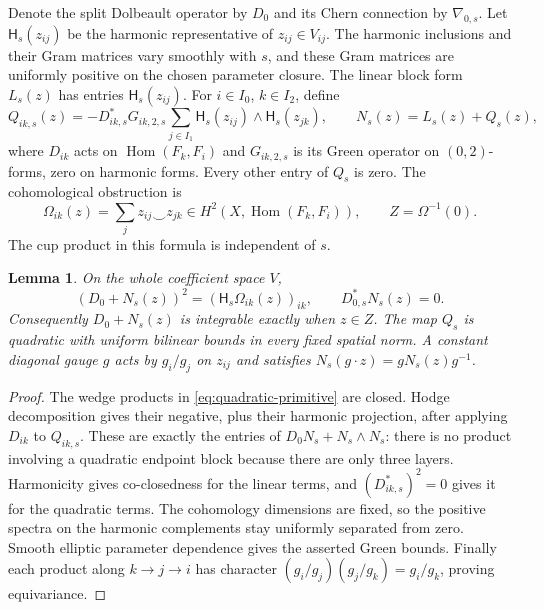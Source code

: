 \documentclass[11pt]{amsart}
\newtheorem{lemma}[theorem]{Lemma}
\theoremstyle{definition}
\theoremstyle{remark}
\newcommand{\Hom}{\operatorname{Hom}}
\newcommand{\HH}{\mathsf H}
\begin{document}
Denote the split Dolbeault operator by $D_0$ and its Chern connection by
$\nabla_{0,s}$. Let $\HH_s(z_{ij})$ be the harmonic representative of
$z_{ij}\in V_{ij}$. The harmonic inclusions and their Gram matrices vary
smoothly with $s$, and these Gram matrices are uniformly positive on the
chosen parameter closure. The linear block form $L_s(z)$ has entries
$\HH_s(z_{ij})$. For $i\in I_0$, $k\in I_2$, define
\begin{equation}\label{eq:quadratic-primitive}
 Q_{ik,s}(z)=-D_{ik,s}^*G_{ik,2,s}
       \sum_{j\in I_1}\HH_s(z_{ij})\wedge\HH_s(z_{jk}),
 \qquad N_s(z)=L_s(z)+Q_s(z),
\end{equation}
where $D_{ik}$ acts on $\Hom(F_k,F_i)$ and $G_{ik,2,s}$ is its
Green operator on $(0,2)$-forms, zero on harmonic forms. Every other
entry of $Q_s$ is zero. The cohomological obstruction is
\begin{equation}\label{eq:obstruction}
 \Omega_{ik}(z)=\sum_j z_{ij}\smile z_{jk}
 \in H^2(X,\Hom(F_k,F_i)),\qquad Z=\Omega^{-1}(0).
\end{equation}
The cup product in this formula is independent of $s$.

\begin{lemma}\label{lem:canonical}
On the whole coefficient space $V$,
\begin{equation}\label{eq:canonical-identities}
 (D_0+N_s(z))^2=(\HH_s\Omega_{ik}(z))_{ik},\qquad
 D_{0,s}^*N_s(z)=0.
\end{equation}
Consequently $D_0+N_s(z)$ is integrable exactly when $z\in Z$.
The map $Q_s$ is quadratic with uniform bilinear bounds in every fixed
spatial norm. A constant diagonal gauge $g$ acts by $g_i/g_j$ on
$z_{ij}$ and satisfies $N_s(g\cdot z)=gN_s(z)g^{-1}$.
\end{lemma}

\begin{proof}
The wedge products in \eqref{eq:quadratic-primitive} are closed. Hodge
decomposition gives their negative, plus their harmonic projection, after
applying $D_{ik}$ to $Q_{ik,s}$. These are exactly the entries of
$D_0N_s+N_s\wedge N_s$: there is no product involving a quadratic
endpoint block because there are only three layers. Harmonicity gives
co-closedness for the linear terms, and $(D_{ik,s}^*)^2=0$ gives it for
the quadratic terms. The cohomology dimensions are fixed, so the positive
spectra on the harmonic complements stay uniformly separated from zero.
Smooth elliptic parameter dependence gives the asserted Green bounds.
Finally each product along $k\to j\to i$ has character
$(g_i/g_j)(g_j/g_k)=g_i/g_k$, proving equivariance.
\end{proof}
\end{document}

